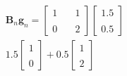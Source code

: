 \documentclass[preview]{standalone}
\begin{document}
\begin{align*}
\mathbf{B}_n \mathbf{g}_n = \begin{bmatrix} 1 & \quad 1 \\ \\0 & \quad 2 \end{bmatrix}\begin{bmatrix} 1.5 \\ \\ 0.5 \end{bmatrix} \\1.5 \begin{bmatrix} 1 \\ \\ 0 \end{bmatrix} + 0.5 \begin{bmatrix} 1 \\ \\ 2 \end{bmatrix}
\end{align*}
\end{document}
